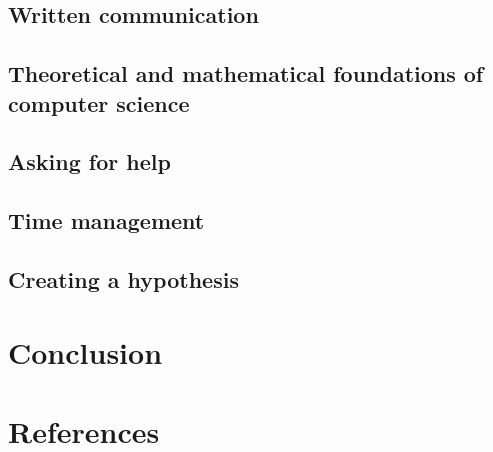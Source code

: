 \documentclass{beamer}
\begin{document}
\subsection{Written communication}
\subsection{Theoretical and mathematical foundations of computer science}
\subsection{Asking for help}
\subsection{Time management}
\subsection{Creating a hypothesis}

\section{Conclusion}
\section{References}

\end{document}
